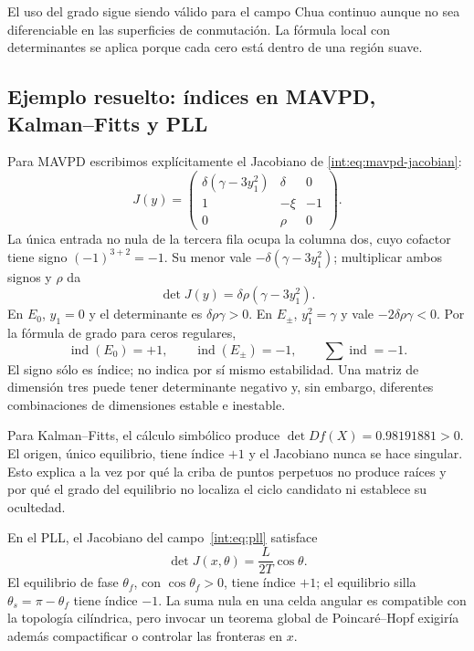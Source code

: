 El uso del grado sigue siendo válido para el campo Chua continuo aunque no sea
diferenciable en las superficies de conmutación. La fórmula local con
determinantes se aplica porque cada cero está dentro de una región suave.

\subsection{Ejemplo resuelto: índices en MAVPD, Kalman--Fitts y PLL}

Para MAVPD escribimos explícitamente el Jacobiano de
\eqref{int:eq:mavpd-jacobian}:
\[
 J(y)=\begin{pmatrix}
 \delta(\gamma-3y_1^2)&\delta&0\\
 1&-\xi&-1\\
 0&\rho&0
 \end{pmatrix}.
\]
La única entrada no nula de la tercera fila ocupa la columna dos, cuyo
cofactor tiene signo \((-1)^{3+2}=-1\). Su menor vale
\(-\delta(\gamma-3y_1^2)\); multiplicar ambos signos y \(\rho\) da
\begin{equation}
 \det J(y)=\delta\rho(\gamma-3y_1^2).
 \label{geo:eq:mavpd-jacobian-det}
\end{equation}
En \(E_0\), \(y_1=0\) y el determinante es \(\delta\rho\gamma>0\).
En \(E_\pm\), \(y_1^2=\gamma\) y vale
\(-2\delta\rho\gamma<0\). Por la fórmula de grado para ceros regulares,
\begin{equation}
 \operatorname{ind}(E_0)=+1,\qquad
 \operatorname{ind}(E_\pm)=-1,\qquad
 \sum\operatorname{ind}=-1.
 \label{geo:eq:mavpd-indices}
\end{equation}
El signo sólo es índice; no indica por sí mismo estabilidad. Una matriz de
dimensión tres puede tener determinante negativo y, sin embargo, diferentes
combinaciones de dimensiones estable e inestable.

Para Kalman--Fitts, el cálculo simbólico produce
\(\det Df(X)=0.98191881>0\). El origen, único equilibrio, tiene índice \(+1\)
y el Jacobiano nunca se hace singular. Esto explica a la vez por qué la criba
de puntos perpetuos no produce raíces y por qué el grado del equilibrio no
localiza el ciclo candidato ni establece su ocultedad.

En el PLL, el Jacobiano del campo~\eqref{int:eq:pll} satisface
\begin{equation}
 \det J(x,\theta)=\frac{L}{2T}\cos\theta.
 \label{geo:eq:pll-jacobian-det}
\end{equation}
El equilibrio de fase \(\theta_f\), con \(\cos\theta_f>0\), tiene índice
\(+1\); el equilibrio silla \(\theta_s=\pi-\theta_f\) tiene índice \(-1\).
La suma nula en una celda angular es compatible con la topología cilíndrica,
pero invocar un teorema global de Poincaré--Hopf exigiría además compactificar
o controlar las fronteras en \(x\).

